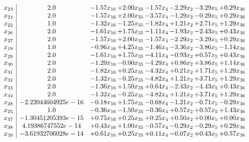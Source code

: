 \documentclass[8pt]{article}
\begin{document}
\[\begin{array}{c| c c@{\hskip 2pt} c@{\hskip 2pt} c@{\hskip 2pt} c@{\hskip 2pt} c@{\hskip 2pt} c@{\hskip 2pt} }
 x_{23}   &  2.0 & -1.57 x_{16} & +  2.00 x_{35} & -1.57 x_{4} & -2.29 x_{2} & -3.29 x_{5} & +  0.29 x_{36}\\
 x_{24}   &  2.0 & -1.57 x_{16} & +  2.00 x_{35} & -3.57 x_{4} & -1.29 x_{2} & -0.29 x_{5} & +  0.29 x_{36}\\
 x_{22}   &  1.0 & -1.32 x_{16} & -1.25 x_{35} & -1.82 x_{4} & +  1.21 x_{2} & +  2.71 x_{5} & +  1.29 x_{36}\\
 x_{26}   &  2.0 & -1.61 x_{16} & +  1.75 x_{35} & -1.11 x_{4} & -1.93 x_{2} & -2.43 x_{5} & +  0.43 x_{36}\\
 x_{27}   &  2.0 & -1.57 x_{16} & +  2.00 x_{35} & -1.57 x_{4} & -2.29 x_{2} & -3.29 x_{5} & +  0.29 x_{36}\\
 x_{19}   &  1.0 & -0.96 x_{16} & +  4.25 x_{35} & -1.46 x_{4} & -3.36 x_{2} & -3.86 x_{5} & -1.14 x_{36}\\
 x_{29}   &  2.0 & -1.61 x_{16} & +  1.75 x_{35} & -4.11 x_{4} & -0.93 x_{2} & +  0.57 x_{5} & +  0.43 x_{36}\\
 x_{30}   &  2.0 & -1.29 x_{16} & -0.00 x_{35} & -4.29 x_{4} & +  0.86 x_{2} & +  3.86 x_{5} & +  1.14 x_{36}\\
 x_{31}   &  2.0 & -1.82 x_{16} & +  0.25 x_{35} & -4.32 x_{4} & +  0.21 x_{2} & +  1.71 x_{5} & +  1.29 x_{36}\\
 x_{32}   &  2.0 & -1.32 x_{16} & -0.25 x_{35} & -4.82 x_{4} & +  1.21 x_{2} & +  3.71 x_{5} & +  1.29 x_{36}\\
 x_{33}   &  2.0 & -1.36 x_{16} & +  1.50 x_{35} & +  0.64 x_{4} & -2.43 x_{2} & -4.43 x_{5} & +  0.43 x_{36}\\
 x_{34}   &  2.0 & -1.32 x_{16} & -0.25 x_{35} & -4.82 x_{4} & +  1.21 x_{2} & +  3.71 x_{5} & +  1.29 x_{36}\\
 x_{28}   &  -2.22044604925e-16 & -0.18 x_{16} & +  1.75 x_{35} & -0.68 x_{4} & -1.21 x_{2} & -0.71 x_{5} & -0.29 x_{36}\\
 x_{25}   &  1.0 & -0.36 x_{16} & -1.50 x_{35} & -0.36 x_{4} & +  0.57 x_{2} & +  0.57 x_{5} & +  1.43 x_{36}\\
 x_{37}   &  -1.30451205393e-15 & +  0.75 x_{16} & +  0.25 x_{35} & +  0.25 x_{4} & +  0.50 x_{2} & +  0.00 x_{5} & +  0.00 x_{36}\\
 x_{38}   &  4.19386747552e-14 & +  0.43 x_{16} & +  1.00 x_{35} & -0.57 x_{4} & -0.29 x_{2} & -0.29 x_{5} & +  0.29 x_{36}\\
 x_{39}   &  -3.61932706028e-14 & +  0.61 x_{16} & +  0.25 x_{35} & +  0.11 x_{4} & -0.07 x_{2} & +  0.43 x_{5} & +  0.57 x_{36}\\

\end{array}\]
\end{document}
